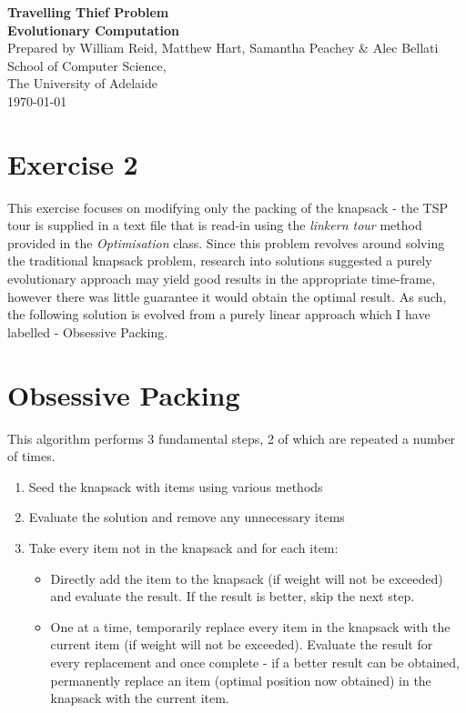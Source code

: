 \documentclass[a4paper,12pt]{article}
\begin{document}
\begin{center}
{\LARGE\bf Travelling Thief Problem}\\
\vspace{0.5cm}
{\Large\bf Evolutionary Computation}\\
\vspace{1cm}
Prepared by William Reid, Matthew Hart, Samantha Peachey \& Alec Bellati\\
\vspace{1cm}
School of Computer Science,\\
The University of Adelaide\\
\vspace{1cm}
\today
\end{center}

\vspace{1cm}
\section*{Exercise 2}
This exercise focuses on modifying only the packing of the knapsack - the TSP tour is supplied in a text file that is read-in using the \textit{linkern tour} method provided in the \textit{Optimisation} class. Since this problem revolves around solving the traditional knapsack problem, research into solutions suggested a purely evolutionary approach may yield good results in the appropriate time-frame, however there was little guarantee it would obtain the optimal result. As such, the following solution is evolved from a purely linear approach which I have labelled - Obsessive Packing.

\section{Obsessive Packing}
This algorithm performs 3 fundamental steps, 2 of which are repeated a number of times.
\begin{enumerate}
	\item Seed the knapsack with items using various methods
	\item Evaluate the solution and remove any unnecessary items
	\item Take every item not in the knapsack and for each item:
		\begin{itemize}
			\item Directly add the item to the knapsack (if weight will not be exceeded) and evaluate the result. If the result is better, skip the next step.
			\item One at a time, temporarily replace every item in the knapsack with the current item (if weight will not be exceeded). Evaluate the result for every replacement and once complete - if a better result can be obtained, permanently replace an item (optimal position now obtained) in the knapsack with the current item.
		\end{itemize}
 \end{enumerate} 
\end{document}
